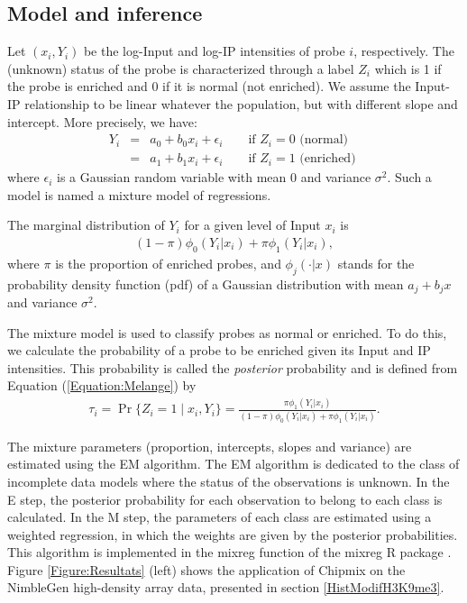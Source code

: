 \documentclass{bioinfo}
\begin{document}
\subsection{Model and inference}
Let $(x_i,Y_i)$ be the log-Input and log-IP intensities of probe $i$,
respectively. The  (unknown) status of the probe is characterized
through a label $Z_i$ which is 1 if the probe is enriched and 0 if
it is normal (not enriched). We assume the Input-IP relationship to
be linear whatever the population, but with different slope and
intercept. More precisely, we have:
\begin{eqnarray}
Y_i &=& a_0 + b_0 x_i + \epsilon_i  \qquad \text{if } Z_i=0 \text{ (normal) } \nonumber\\
 &=& a_1 + b_1 x_i + \epsilon_i  \qquad \text{if } Z_i=1 \text{  (enriched) } \nonumber
\end{eqnarray}
where $\epsilon_i$ is a Gaussian random variable with mean 0 and
variance $\sigma^2$. Such a model is named a mixture model of
regressions.

The marginal distribution of $Y_i$ for a given level of Input $x_i$
is
\begin{eqnarray}
(1-\pi) \phi_0(Y_i | x_i) + \pi \phi_1(Y_i | x_i),
\label{Equation:Melange} %
\end{eqnarray}
where $\pi$ is the proportion of enriched probes, and
$\phi_j(\cdot|x)$ stands for the probability density function (pdf) of
a Gaussian distribution with mean $a_j+b_j x$ and variance $\sigma^2$.

The mixture model is used to classify probes as normal or enriched. To do this, we calculate
the probability of a probe to be enriched given its Input and IP intensities. This probability
is called the \textit{posterior} probability and is defined from Equation
(\ref{Equation:Melange}) by
\begin{eqnarray}
\tau_i = \Pr\{Z_i=1 \;|\; x_i,Y_i\}=\frac{\pi
  \phi_1(Y_i |x_i)}{(1-\pi) \phi_0(Y_i|x_i) + \pi \phi_1(Y_i|x_i)}. \label{Equation:Posterior}
\end{eqnarray}

The mixture parameters (proportion, intercepts, slopes and variance)
are estimated using the EM algorithm. The EM algorithm is dedicated to
the class of incomplete data models where the status of the
observations is unknown. In the E step, the posterior probability for
each observation to belong to each class is calculated. In the M step,
the parameters of each class are estimated using a weighted
regression, in which the weights are given by the posterior
probabilities. This algorithm is implemented in the mixreg function of
the mixreg R package \citep{Turner00}. Figure \ref{Figure:Resultats} (left) shows the application of Chipmix on the NimbleGen high-density array data, presented in section \ref{HistModifH3K9me3}.
\end{document}
